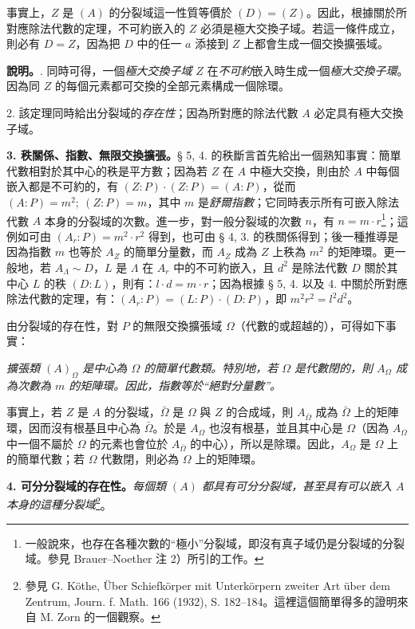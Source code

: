 \documentclass[11pt]{article}
\providecommand{\srcspaced}[1]{#1}
\begin{document}
事實上，\(Z\) 是 \((A)\) 的分裂域這一性質等價於 \((D)=(Z)\)。因此，根據關於所對應除法代數的定理，不可約嵌入的 \(Z\) 必須是極大交換子域。若這一條件成立，則必有 \(D=Z\)，因為把 \(D\) 中的任一 \(a\) 添接到 \(Z\) 上都會生成一個交換擴張域。

\noindent\textbf{\srcspaced{說明。}}. 同時可得，一個\emph{極大交換子域} \(Z\) 在\emph{不可約}嵌入時生成一個\emph{極大交換子環}。因為同 \(Z\) 的每個元素都可交換的全部元素構成一個除環。

2. 該定理同時給出分裂域的\emph{存在性}；因為所對應的除法代數 \(A\) 必定具有極大交換子域。

\medskip
\noindent\textbf{\srcspaced{3. 秩關係、指數、無限交換擴張。}}\quad § 5, 4. 的秩斷言首先給出一個熟知事實：簡單代數相對於其中心的秩是平方數；因為若 \(Z\) 在 \(A\) 中極大交換，則由於 \(A\) 中每個嵌入都是不可約的，有 \((Z:P)\cdot(Z:P)=(A:P)\)，從而 \((A:P)=m^2;\ (Z:P)=m\)，其中 \(m\) 是\emph{舒爾指數}；它同時表示所有可嵌入除法代數 \(A\) 本身的分裂域的次數。進一步，對一般分裂域的次數 \(n\)，有 \(n=m\cdot r\)\footnote{一般說來，也存在各種次數的“極小”分裂域，即沒有真子域仍是分裂域的分裂域。參見 Brauer--Noether 注 2）所引的工作。}；這例如可由 \((A_r:P)=m^2\cdot r^2\) 得到，也可由 § 4, 3. 的秩關係得到；後一種推導是因為指數 \(m\) 也等於 \(A_Z\) 的簡單分量數，而 \(A_Z\) 成為 \(Z\) 上秩為 \(m^2\) 的矩陣環。更一般地，若 \(A_\Lambda\sim D\)，\(L\) 是 \(\Lambda\) 在 \(A_r\) 中的不可約嵌入，且 \(d^2\) 是除法代數 \(D\) 關於其中心 \(L\) 的秩 \((D:L)\)，則有：\(l\cdot d=m\cdot r\)；因為根據 § 5, 4. 以及 4. 中關於所對應除法代數的定理，有：\((A_r:P)=(L:P)\cdot(D:P)\)，即 \(m^2r^2=l^2d^2\)。

由分裂域的存在性，對 \(P\) 的無限交換擴張域 \(\Omega\)（代數的或超越的），可得如下事實：

\noindent\emph{擴張類 \((A)_\Omega\) 是中心為 \(\Omega\) 的簡單代數類。特別地，若 \(\Omega\) 是代數閉的，則 \(A_\Omega\) 成為次數為 \(m\) 的矩陣環。因此，指數等於“絕對分量數”。}

事實上，若 \(Z\) 是 \(A\) 的分裂域，\(\bar\Omega\) 是 \(\Omega\) 與 \(Z\) 的合成域，則 \(A_{\bar\Omega}\) 成為 \(\bar\Omega\) 上的矩陣環，因而沒有根基且中心為 \(\bar\Omega\)。於是 \(A_\Omega\) 也沒有根基，並且其中心是 \(\Omega\)（因為 \(A_\Omega\) 中一個不屬於 \(\Omega\) 的元素也會位於 \(A_{\bar\Omega}\) 的中心），所以是除環。因此，\(A_\Omega\) 是 \(\Omega\) 上的簡單代數；若 \(\Omega\) 代數閉，則必為 \(\Omega\) 上的矩陣環。

\medskip
\noindent\textbf{\srcspaced{4. 可分分裂域的存在性。}}\quad \emph{每個類 \((A)\) 都具有可分分裂域，甚至具有可以嵌入 \(A\) 本身的這種分裂域}\footnote{參見 G. Köthe, Über Schiefkörper mit Unterkörpern zweiter Art über dem Zentrum, Journ. f. Math. 166 (1932), S. 182--184。這裡這個簡單得多的證明來自 M. Zorn 的一個觀察。}。
\end{document}
